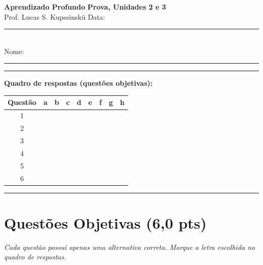 \documentclass[11pt,a4paper]{article}
\begin{document}
{\Large\bfseries Aprendizado Profundo} \hfill \textbf{Prova, Unidades 2 e 3}\\
Prof. Lucas S. Kupssinskü \hfill Data: \rule{3cm}{0.4pt}\\[0.4em]
Nome: \rule{12cm}{0.4pt}

\rule{\linewidth}{0.8pt}

\textbf{Quadro de respostas (questões objetivas):}\\[0.3em]
\begin{center}
\begin{tabular}{|c|c|c|c|c|c|c|c|c|}
\hline
\textbf{Questão} & \textbf{a} & \textbf{b} & \textbf{c} & \textbf{d} & \textbf{e} & \textbf{f} & \textbf{g} & \textbf{h} \\\hline
1 & & & & & & & & \\\hline
2 & & & & & & & & \\\hline
3 & & & & & & & & \\\hline
4 & & & & & & & & \\\hline
5 & & & & & & & & \\\hline
6 & & & & & & & & \\\hline
\end{tabular}
\end{center}

\rule{\linewidth}{0.4pt}

\section*{Questões Objetivas (6{,}0 pts)}
\textit{Cada questão possui apenas uma alternativa correta. Marque a letra escolhida no quadro de respostas.}
\end{document}
